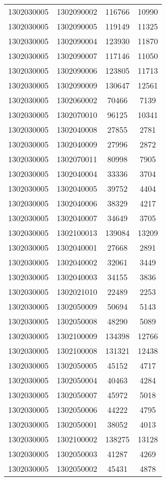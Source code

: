 \begin{longtable}[h]{llcc}
		1302030005 & 1302090002 & 116766 & 10990\\
		1302030005 & 1302090005 & 119149 & 11325\\
		1302030005 & 1302090004 & 123930 & 11870\\
		1302030005 & 1302090007 & 117146 & 11050\\
		1302030005 & 1302090006 & 123805 & 11713\\
		1302030005 & 1302090009 & 130647 & 12561\\
		1302030005 & 1302060002 & 70466 & 7139\\
		1302030005 & 1302070010 & 96125 & 10341\\
		1302030005 & 1302040008 & 27855 & 2781\\
		1302030005 & 1302040009 & 27996 & 2872\\
		1302030005 & 1302070011 & 80998 & 7905\\
		1302030005 & 1302040004 & 33336 & 3704\\
		1302030005 & 1302040005 & 39752 & 4404\\
		1302030005 & 1302040006 & 38329 & 4217\\
		1302030005 & 1302040007 & 34649 & 3705\\
		1302030005 & 1302100013 & 139084 & 13209\\
		1302030005 & 1302040001 & 27668 & 2891\\
		1302030005 & 1302040002 & 32061 & 3449\\
		1302030005 & 1302040003 & 34155 & 3836\\
		1302030005 & 1302021010 & 22489 & 2253\\
		1302030005 & 1302050009 & 50694 & 5143\\
		1302030005 & 1302050008 & 48290 & 5089\\
		1302030005 & 1302100009 & 134398 & 12766\\
		1302030005 & 1302100008 & 131321 & 12438\\
		1302030005 & 1302050005 & 45152 & 4717\\
		1302030005 & 1302050004 & 40463 & 4284\\
		1302030005 & 1302050007 & 45972 & 5018\\
		1302030005 & 1302050006 & 44222 & 4795\\
		1302030005 & 1302050001 & 38052 & 4013\\
		1302030005 & 1302100002 & 138275 & 13128\\
		1302030005 & 1302050003 & 41287 & 4269\\
		1302030005 & 1302050002 & 45431 & 4878\\

\end{longtable}
